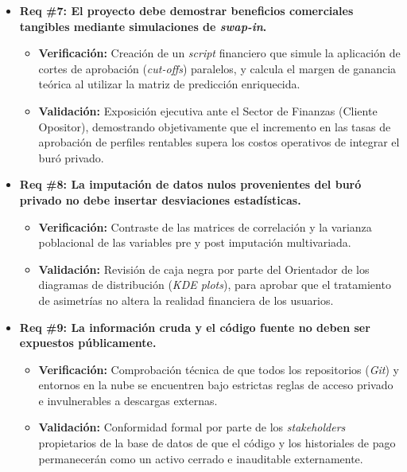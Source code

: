 \documentclass[
11pt, %
]{charter}
\begin{document}
\begin{itemize}
    \item \textbf{Req \#7: El proyecto debe demostrar beneficios comerciales tangibles mediante simulaciones de \textit{swap-in}.}
    \begin{itemize}
        \item \textbf{Verificación:} Creación de un \textit{script} financiero que simule la aplicación de cortes de aprobación (\textit{cut-offs}) paralelos, y calcula el margen de ganancia teórica al utilizar la matriz de predicción enriquecida.
        \item \textbf{Validación:} Exposición ejecutiva ante el Sector de Finanzas (Cliente Opositor), demostrando objetivamente que el incremento en las tasas de aprobación de perfiles rentables supera los costos operativos de integrar el buró privado.
    \end{itemize}

    \item \textbf{Req \#8: La imputación de datos nulos provenientes del buró privado no debe insertar desviaciones estadísticas.}
    \begin{itemize}
        \item \textbf{Verificación:} Contraste de las matrices de correlación y la varianza poblacional de las variables pre y post imputación multivariada.
        \item \textbf{Validación:} Revisión de caja negra por parte del Orientador de los diagramas de distribución (\textit{KDE plots}), para aprobar que el tratamiento de asimetrías no altera la realidad financiera de los usuarios.
    \end{itemize}

    \item \textbf{Req \#9: La información cruda y el código fuente no deben ser expuestos públicamente.}
    \begin{itemize}
        \item \textbf{Verificación:} Comprobación técnica de que todos los repositorios (\textit{Git}) y entornos en la nube se encuentren bajo estrictas reglas de acceso privado e invulnerables a descargas externas.
        \item \textbf{Validación:} Conformidad formal por parte de los \textit{stakeholders} propietarios de la base de datos de que el código y los historiales de pago permanecerán como un activo cerrado e inauditable externamente.
    \end{itemize}


\end{itemize}
\end{document}
